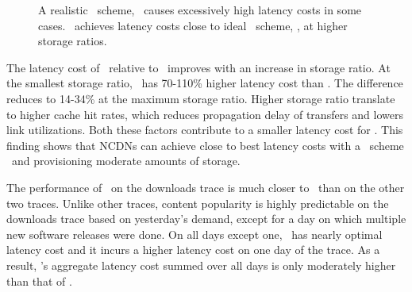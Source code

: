 \begin{figure}[t]
\begin{center}
\end{center}
\vspace{-0.2in}
\caption{ A realistic \planned\ scheme, \optrpl\ causes excessively high latency costs in some cases. \invlru\ achieves latency costs close to ideal \planned\ scheme, \optrpfuturel,  at higher storage ratios.}
\vspace{-0.2in}
\label{fig:latencygraphs}
\end{figure}




The latency cost of \invlru\ relative to \optrpfuturel\ improves with an increase in storage ratio. At the smallest storage ratio, \invlru\  has 70-110\% higher latency cost than \optrpfuturel. The difference reduces to  14-34\% at the maximum storage ratio. Higher storage ratio translate to higher cache hit rates, which reduces propagation delay of transfers and lowers link utilizations. Both these factors contribute to  a smaller latency cost for \invlru. 
This finding shows that NCDNs can achieve close to best latency costs with a \unplanned\ scheme \invlru\ and provisioning moderate amounts of storage.

The performance of \optrpl\ on the downloads trace is much closer to \optrpfuturel\ than on the other two traces. 
Unlike other traces, content popularity is highly predictable on the downloads trace based on yesterday's demand, except for a day on which multiple new software releases were done.  On all days except one,  \optrpl\ has nearly optimal latency cost and it incurs a higher latency cost on one day of the trace. As a result, \optrpl's aggregate latency cost summed over all days is only moderately higher than that of \optrpfuturel. 



